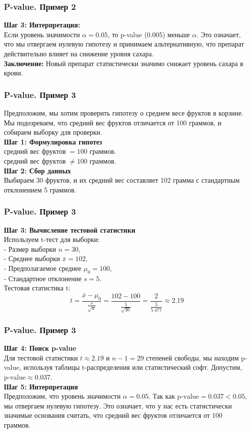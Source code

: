 \documentclass[aspectratio=169]{beamer}
\begin{document}
\begin{frame}
\frametitle{P-value. Пример 2}
{\bf Шаг 3: Интерпретация:}\\
Если уровень значимости \(\alpha = 0.05\), то p-value (0.005) меньше \(\alpha\). Это означает, что мы отвергаем нулевую гипотезу и принимаем альтернативную, что препарат действительно влияет на снижение уровня сахара.
\newline\\
{\bf Заключение:} Новый препарат статистически значимо снижает уровень сахара в крови.
\end{frame}

\begin{frame}
\frametitle{P-value. Пример 3}
Предположим, мы хотим проверить гипотезу о среднем весе фруктов в корзине. Мы подозреваем, что средний вес фруктов отличается от 100 граммов, и собираем выборку для проверки.\\
{\bf Шаг 1: Формулировка гипотез}\\
 средний вес фруктов \(= 100\) граммов.\\
 средний вес фруктов \(\neq 100\) граммов.\\
{\bf Шаг 2: Сбор данных}\\
Выбираем 30 фруктов, и их средний вес составляет 102 грамма с стандартным отклонением 5 граммов.\\
\end{frame}

\begin{frame}
\frametitle{P-value. Пример 3}
{\bf Шаг 3: Вычисление тестовой статистики}\\
Используем t-тест для выборки:\\
\quad - Размер выборки \(n = 30\),\\
\quad - Среднее выборки \( \bar{x} = 102 \),\\
\quad - Предполагаемое среднее \( \mu_0 = 100 \),\\
\quad - Стандартное отклонение \( s = 5 \).\\
Тестовая статистика t:
\[
t = \frac{\bar{x} - \mu_0}{\frac{s}{\sqrt{n}}} = \frac{102 - 100}{\frac{5}{\sqrt{30}}} = \frac{2}{\frac{5}{5.477}} \approx 2.19
\]
\end{frame}

\begin{frame}
\frametitle{P-value. Пример 3}
{\bf Шаг 4: Поиск p-value}\\
Для тестовой статистики \(t \approx 2.19\) и \(n - 1 = 29\) степеней свободы, мы находим p-value, используя таблицы t-распределения или статистический софт. Допустим, \(\text{p-value} \approx 0.037\).\\
{\bf Шаг 5: Интерпретация}\\
Предположим, что уровень значимости \(\alpha = 0.05\). Так как \(\text{p-value} = 0.037 < 0.05\), мы отвергаем нулевую гипотезу. Это означает, что у нас есть статистически значимые основания считать, что средний вес фруктов отличается от 100 граммов.
\end{frame}
\end{document}
